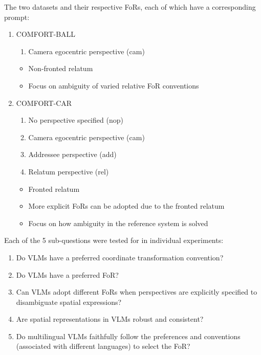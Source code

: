 \documentclass[12pt, letterpaper]{article}
\begin{document}
\begin{spacing}{1.10}
\noindent The two datasets and their respective FoRs, each of which have a corresponding prompt:
\begin{enumerate}
    \item COMFORT-BALL
    \begin{enumerate}
        \item Camera egocentric perspective (cam)
    \end{enumerate}
    \begin{itemize}
        \item Non-fronted relatum
        \item Focus on ambiguity of varied relative FoR conventions 
    \end{itemize}
    \item COMFORT-CAR
    \begin{enumerate}
        \item No perspective specified (nop)
        \item Camera egocentric perspective (cam)
        \item Addressee perspective (add)
        \item Relatum perspective (rel)
    \end{enumerate}
    \begin{itemize}
        \item Fronted relatum
        \item More explicit FoRs can be adopted due to the fronted relatum
        \item Focus on how ambiguity in the reference system is solved
    \end{itemize}
\end{enumerate}

\noindent Each of the 5 sub-questions were tested for in individual experiments:
\begin{enumerate}
    \item Do VLMs have a preferred coordinate transformation convention?
    \item Do VLMs have a preferred FoR?
    \item Can VLMs adopt different FoRs when perspectives are explicitly specified to disambiguate spatial expressions?
    \item Are spatial representations in VLMs robust and consistent?
    \item Do multilingual VLMs faithfully follow the preferences and conventions (associated with different languages) to select the FoR?
\end{enumerate}


\end{spacing}
\end{document}
